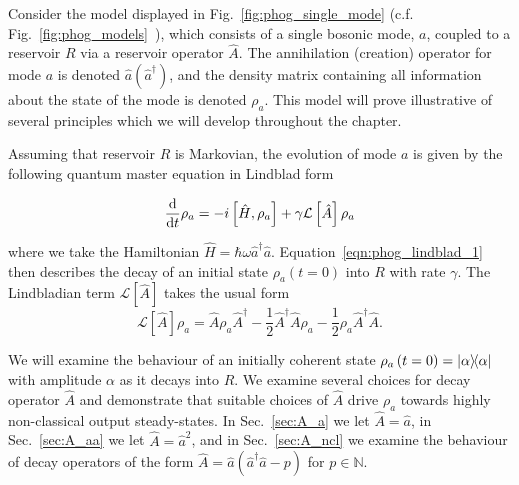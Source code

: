 
Consider the model displayed in Fig.~\ref{fig:phog_single_mode} (c.f. Fig.~\ref{fig:phog_models}~\MakeUppercase{}), which consists of a single bosonic mode, $a$, coupled to a reservoir $R$ via a reservoir operator $\hat{A}$. The annihilation (creation) operator for mode $a$ is denoted $\hat{a} \left(\hat{a}^\dagger\right)$, and the density matrix containing all information about the state of the mode is denoted $\rho_a$. This model will prove illustrative of several principles which we will develop throughout the chapter. 

Assuming that reservoir $R$ is Markovian, the evolution of mode $a$ is given by the following quantum master equation in Lindblad form


\begin{equation}\label{eqn:phog_lindblad_1}
\frac{\mathrm{d}}{\mathrm{d}t} \rho_a =  - i \left[\hat{H}, \rho_a\right] + \gamma \mathcal{L}\left[\hat{A}\right]\rho_a
\end{equation}

\noindent where we take the Hamiltonian $\hat{H} = \hbar \omega \hat{a}^\dagger \hat{a}$. Equation~\ref{eqn:phog_lindblad_1} then describes the decay of an initial state $\rho_a\left(t=0\right)$ into $R$ with rate $\gamma$. The Lindbladian term $\mathcal{L}\left[\hat{A}\right]$ takes the usual form
\begin{equation}\label{eqn:phog_lindbladian_form}
\mathcal{L}\left[\hat{A}\right]\rho_a = \hat{A}\rho_a\hat{A}^\dagger - \frac{1}{2} \hat{A}^\dagger \hat{A} \rho_a - \frac{1}{2} \rho_a \hat{A}^\dagger \hat{A}.
\end{equation}

\noindent We will examine the behaviour of an initially coherent state $\rho_a\left(t=0\right) = \dyad{\alpha}$ with amplitude $\alpha$ as it decays into $R$. We examine several choices for decay operator $\hat{A}$ and demonstrate that suitable choices of $\hat{A}$ drive $\rho_a$ towards highly non-classical output steady-states. In Sec.~\ref{sec:A_a} we let $\hat{A} = \hat{a}$, in Sec.~\ref{sec:A_aa} we let $\hat{A} = \hat{a}^2$, and in Sec.~\ref{sec:A_ncl} we examine the behaviour of decay operators of the form $\hat{A} = \hat{a} \left(\hat{a}^\dagger \hat{a} - p\right)$ for $p \in \mathbb{N}$.




